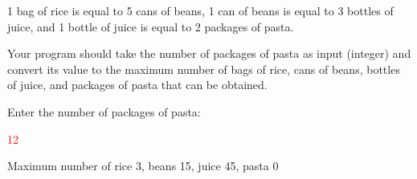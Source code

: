 1 bag of rice is equal to 5 cans of beans, 1 can of beans is equal to 3 bottles of juice, and 1 bottle of juice is equal to 2 packages of pasta.

Your program should take the number of packages of pasta as input (integer) and convert its value to the maximum number of bags of rice, cans of beans, bottles of juice, and packages of pasta that can be obtained.

\begin{sample}
Enter the number of packages of pasta:

\textcolor{red}{12}

Maximum number of rice 3, beans 15, juice 45, pasta 0

\end{sample}
